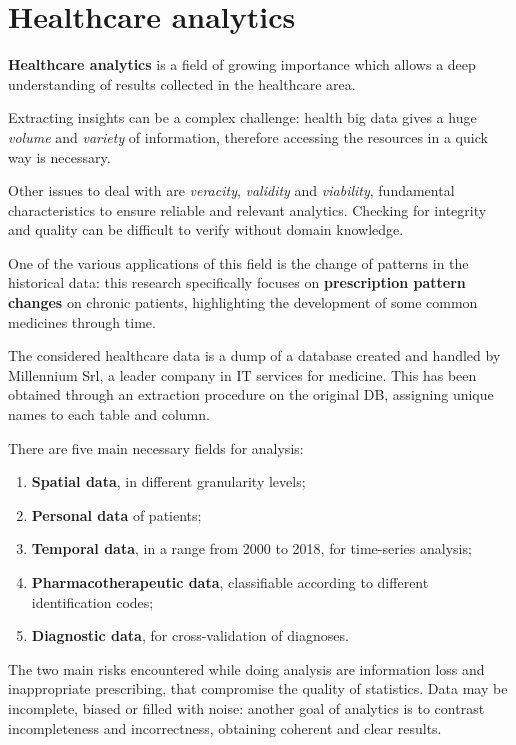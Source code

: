 \section{Healthcare analytics}
\textbf{Healthcare analytics} is a field of growing importance which allows a deep understanding of results collected in the healthcare area. 

Extracting insights can be a complex challenge: health big data gives a huge \textit{volume} and \textit{variety} of information, therefore accessing the resources in a quick way is necessary. 

Other issues to deal with are \textit{veracity}, \textit{validity} and \textit{viability}, fundamental characteristics to ensure reliable and relevant analytics. Checking for integrity and quality can be difficult to verify without domain knowledge\cite{4vs}.

One of the various applications of this field is the change of patterns in the historical data: this research specifically focuses on \textbf{prescription pattern changes} on chronic patients, highlighting the development of some common medicines through time.

The considered healthcare data is a dump of a database created and handled by Millennium Srl\cite{millewin}, a leader company in IT services for medicine. This has been obtained through an extraction procedure on the original DB, assigning unique names to each table and column.

There are five main necessary fields for analysis\cite{DC}:
\begin{enumerate}
	\item \textbf{Spatial data}, in different granularity levels;
	\item \textbf{Personal data} of patients;
	\item \textbf{Temporal data}, in a range from 2000 to 2018, for time-series analysis;
	\item \textbf{Pharmacotherapeutic data}, classifiable according to different identification codes;
	\item \textbf{Diagnostic data}, for cross-validation of diagnoses.
\end{enumerate}

The two main risks encountered while doing analysis are information loss and inappropriate prescribing, that compromise the quality of statistics. Data may be incomplete, biased or filled with noise: another goal of analytics is to contrast incompleteness and incorrectness, obtaining coherent and clear results.
